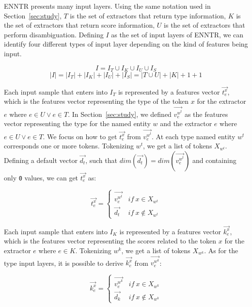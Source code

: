 \documentclass{llncs}
\newcommand{\secref}[1]{\mbox{Section~\ref{#1}}}
\begin{document}
ENNTR presents many input layers. Using the same notation used in \secref{sec:study}, $T$ is the set of extractors that return type information, $K$ is the set of extractors that return score information, $U$ is the set of extractors that perform disambiguation. Defining $I$ as the set of input layers of ENNTR, we can identify four different types of input layer depending on the kind of features being input.

$$I = I_T \cup I_K \cup I_U \cup I_S$$
$$\left\vert{I}\right\vert= \left\vert{I_T}\right\vert + \left\vert{I_K}\right\vert + \left\vert{I_U}\right\vert + \left\vert{I_S}\right\vert  = \left\vert{T \cup U}\right\vert + \left\vert{K}\right\vert + 1 + 1$$

Each input sample that enters into $I_T$  is represented by a features vector $\vec{t^{x}_{e}}$, which is the features vector representing the type of the token $x$ for the extractor $e$ where $e \in U \lor e \in T$. In \secref{sec:study}, we defined $\vec{v^{w^t}_{e}}$ as the features vector representing the type for the named entity $w$ and the extractor $e$ where $e \in U \lor e \in T$. We focus on how to get $\vec{t^{x}_{e}}$ from $\vec{v^{w^t}_{e}}$. At each type named entity $w^{t}$ corresponds one or more tokens. Tokenizing $w^{t}$, we get a list of tokens $X_{w^{t}}$. Defining a default vector $\vec{d_t}$, such that $dim(\vec{d_t}) = dim(\vec{v^{w^t}_{e}})$  and containing only \texttt{0} values, we can get $\vec{t^{x}_{e}}$ as:

\begin{equation} \label{eq:type_feat}
\vec{t^{x}_{e}} = \left\{\begin{matrix} 
\vec{v^{w^t}_{e}} & if \: x \in X_{w^{t}}\\
\vec{d_t} & if \: x \notin X_{w^{t}}
\end{matrix}\right.
\end{equation}

Each input sample that enters into $I_K$  is represented by a features vector $\vec{k^{x}_{e}}$, which is the features vector representing the scores related to the token $x$ for the extractor $e$ where $e \in K$. Tokenizing $w^{k}$, we get a list of tokens $X_{w^{k}}$.
As for the type input layers, it is possible to derive $\vec{k^{x}_{e}}$ from $\vec{v^{w^k}_{e}}$:

\begin{equation} \label{eq:score_feat}
\vec{k^{x}_{e}} = \left\{\begin{matrix} 
\vec{v^{w^k}_{e}} & if \: x \in X_{w^{k}}\\
\vec{d_k} & if \: x \notin X_{w^{k}}
\end{matrix}\right.
\end{equation}
\end{document}
